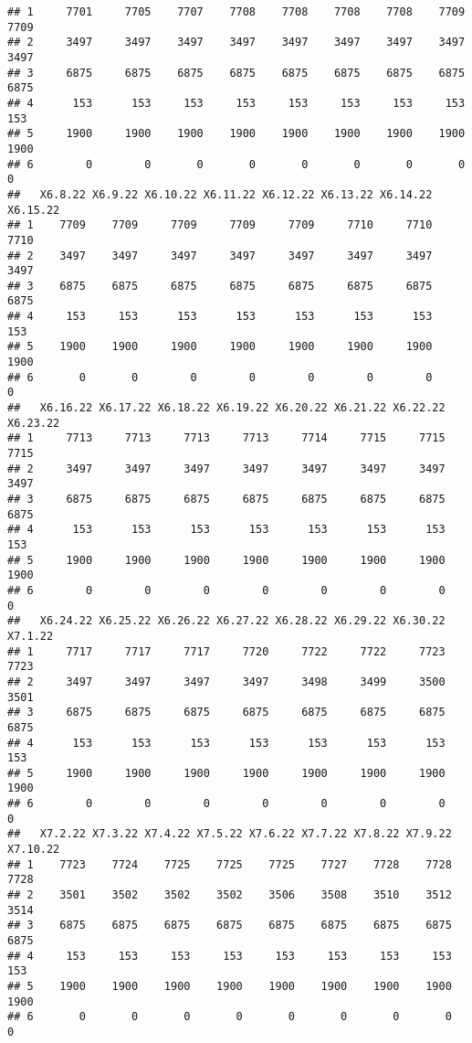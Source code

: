 \documentclass[
]{article}
\begin{document}
\begin{verbatim}
## 1     7701     7705    7707    7708    7708    7708    7708    7709    7709
## 2     3497     3497    3497    3497    3497    3497    3497    3497    3497
## 3     6875     6875    6875    6875    6875    6875    6875    6875    6875
## 4      153      153     153     153     153     153     153     153     153
## 5     1900     1900    1900    1900    1900    1900    1900    1900    1900
## 6        0        0       0       0       0       0       0       0       0
##   X6.8.22 X6.9.22 X6.10.22 X6.11.22 X6.12.22 X6.13.22 X6.14.22 X6.15.22
## 1    7709    7709     7709     7709     7709     7710     7710     7710
## 2    3497    3497     3497     3497     3497     3497     3497     3497
## 3    6875    6875     6875     6875     6875     6875     6875     6875
## 4     153     153      153      153      153      153      153      153
## 5    1900    1900     1900     1900     1900     1900     1900     1900
## 6       0       0        0        0        0        0        0        0
##   X6.16.22 X6.17.22 X6.18.22 X6.19.22 X6.20.22 X6.21.22 X6.22.22 X6.23.22
## 1     7713     7713     7713     7713     7714     7715     7715     7715
## 2     3497     3497     3497     3497     3497     3497     3497     3497
## 3     6875     6875     6875     6875     6875     6875     6875     6875
## 4      153      153      153      153      153      153      153      153
## 5     1900     1900     1900     1900     1900     1900     1900     1900
## 6        0        0        0        0        0        0        0        0
##   X6.24.22 X6.25.22 X6.26.22 X6.27.22 X6.28.22 X6.29.22 X6.30.22 X7.1.22
## 1     7717     7717     7717     7720     7722     7722     7723    7723
## 2     3497     3497     3497     3497     3498     3499     3500    3501
## 3     6875     6875     6875     6875     6875     6875     6875    6875
## 4      153      153      153      153      153      153      153     153
## 5     1900     1900     1900     1900     1900     1900     1900    1900
## 6        0        0        0        0        0        0        0       0
##   X7.2.22 X7.3.22 X7.4.22 X7.5.22 X7.6.22 X7.7.22 X7.8.22 X7.9.22 X7.10.22
## 1    7723    7724    7725    7725    7725    7727    7728    7728     7728
## 2    3501    3502    3502    3502    3506    3508    3510    3512     3514
## 3    6875    6875    6875    6875    6875    6875    6875    6875     6875
## 4     153     153     153     153     153     153     153     153      153
## 5    1900    1900    1900    1900    1900    1900    1900    1900     1900
## 6       0       0       0       0       0       0       0       0        0

\end{verbatim}
\end{document}
